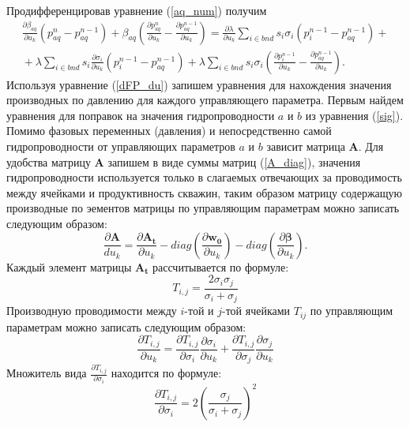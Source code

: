 \documentclass[14pt]{article}
\begin{document}
Продифференцировав уравнение (\ref{aq_num}) получим
\begin{eqnarray} \label{dFAq_num}
\frac{\partial \beta_{aq}}{\partial u_k}\left(p_{aq}^n - p_{aq}^{n-1}\right)
+\beta_{aq}\left(\frac{\partial p_{aq}^n}{\partial u_k} - \frac{\partial p_{aq}^{n-1}}{\partial u_k}\right)
 = \frac{\partial \lambda}{\partial u_k}\sum_{i \in bnd}s_i\sigma_i\left(p_i^{n-1}-p_{aq}^{n-1}\right)+ {} \nonumber\\
 {} + \lambda\sum_{i \in bnd}s_i\frac{\partial \sigma_i}{\partial u_k}\left(p_i^{n-1}-p_{aq}^{n-1}\right)+
 \lambda\sum_{i \in bnd}s_i\sigma_i\left(\frac{\partial p_i^{n-1}}{\partial u_k}-\frac{\partial p_{aq}^{n-1}}{\partial u_k}\right).
\end{eqnarray}
Используя уравнение (\ref{dFP_du}) запишем уравнения для нахождения значения производных по давлению для каждого управляющего параметра. Первым найдем уравнения для поправок на значения гидропроводности $ a $ и $ b $ из уравнения (\ref{sig}). Помимо фазовых переменных (давления) и непосредственно самой гидропроводности от управляющих параметров $ a $ и $ b $ зависит матрица $ \boldsymbol{A} $. Для удобства матрицу $ \boldsymbol{A} $ запишем в виде суммы матриц (\ref{A_diag}), значения гидропроводности используется только в слагаемых отвечающих за проводимость между ячейками и продуктивность скважин, таким образом матрицу содержащую производные по эементов матрицы по управляющим параметрам можно записать следующим образом:
\begin{equation} \label{dA_du_k}
\frac{\partial \boldsymbol{A}}{du_k} = \frac{\partial \boldsymbol{A_t}}{\partial u_k}-diag(\frac{\partial \boldsymbol{w_0}}{\partial u_k})
-diag(\frac{\partial \boldsymbol{\beta}}{\partial u_k}).
\end{equation}
Каждый элемент матрицы $ \boldsymbol{A_t} $ рассчитывается по формуле:
\begin{equation} \label{Tij}
T_{i,j} = \frac{2{\sigma_i}{\sigma_j}}{{\sigma_i} + {\sigma_j}}
\end{equation}
Производную проводимости между $ i $-той и $ j $-той ячейками $ T_{ij} $ по управляющим параметрам можно записать следующим образом:
\begin{equation} \label{dTij_da}
\frac{\partial T_{i,j}}{\partial u_k} = \frac{\partial T_{i,j}}{\partial \sigma_i}\frac{\partial \sigma_i}{\partial u_k} + \frac{\partial T_{i,j}}{\partial \sigma_j}\frac{\partial \sigma_j}{\partial u_k}
\end{equation}
Множитель вида $ \frac{\partial T_{i,j}}{\partial \sigma_i} $ находится по формуле:
\begin{equation} \label{dTij_dsigma_i}
\frac{\partial T_{i,j}}{\partial \sigma_i} = 2\left(\frac{\sigma_j}{{\sigma_i} + {\sigma_j}}\right)^2
\end{equation}
\end{document}
